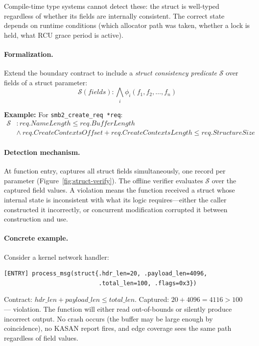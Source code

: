 \documentclass{article}
\begin{document}
Compile-time type systems cannot detect these: the struct is well-typed
regardless of whether its fields are internally consistent. The correct state
depends on runtime conditions (which allocator path was taken, whether a lock
is held, what RCU grace period is active).

\paragraph{Formalization.} Extend the boundary contract to include a
\emph{struct consistency predicate} $\mathcal{S}$ over fields of a struct
parameter:
$$\mathcal{S}(\mathit{fields}): \bigwedge_i \phi_i(f_1, f_2, \ldots, f_n)$$

\noindent\textbf{Example:} For \texttt{smb2\_create\_req *req}:
\begin{align*}
\mathcal{S}&: \mathit{req.NameLength} \leq \mathit{req.BufferLength} \\
           &\wedge\ \mathit{req.CreateContextsOffset} + \mathit{req.CreateContextsLength}
              \leq \mathit{req.StructureSize}
\end{align*}

\paragraph{Detection mechanism.} At function entry, \toolname{} captures all
struct fields simultaneously, one record per parameter
(Figure~\ref{fig:struct-verify}). The offline
verifier evaluates $\mathcal{S}$ over the captured field values. A violation
means the function received a struct whose internal state is inconsistent with
what its logic requires---either the caller constructed it incorrectly, or
concurrent modification corrupted it between construction and use.

\paragraph{Concrete example.} Consider a kernel network handler:
\begin{lstlisting}[numbers=none]
[ENTRY] process_msg(struct{.hdr_len=20, .payload_len=4096,
                           .total_len=100, .flags=0x3})
\end{lstlisting}
Contract: $\mathit{hdr\_len} + \mathit{payload\_len} \leq \mathit{total\_len}$.
Captured: $20 + 4096 = 4116 > 100$ --- violation. The function will either
read out-of-bounds or silently produce incorrect output. No crash occurs
(the buffer may be large enough by coincidence), no KASAN report fires,
and edge coverage sees the same path regardless of field values.
\end{document}

